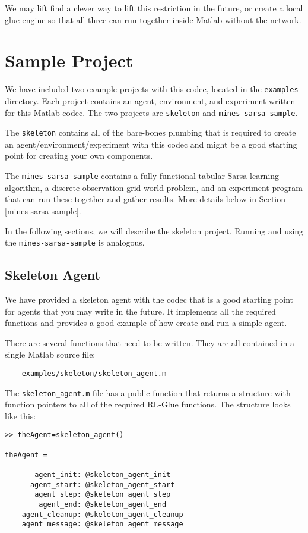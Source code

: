 \documentclass[11pt]{article}
\begin{document}
We may lift find a clever way to lift this restriction in the future, or create a local glue engine so that all three can run together inside Matlab without the network.

\section{Sample Project}
We have included two example projects with this codec, located in the \texttt{examples} directory.  Each project contains an agent, environment, and experiment written for this Matlab codec.  The two projects are \texttt{skeleton} and \texttt{mines-sarsa-sample}.

The \texttt{skeleton} contains all of the bare-bones plumbing that is required to create an agent/environment/experiment with this codec and might be a good starting point for creating your own components.

The \texttt{mines-sarsa-sample} contains a fully functional tabular Sarsa learning algorithm, a discrete-observation grid world problem, and an experiment program that can run these together and gather results.  More details below in Section \ref{mines-sarsa-sample}.

In the following sections, we will describe the skeleton project.  Running and using the \texttt{mines-sarsa-sample} is analogous.

\subsection{Skeleton Agent}
\label{sec:agent}
We have provided a skeleton agent with the codec that is a good starting point for agents that you may write in the future.
It implements all the required functions and provides a good example of how create and run a simple agent.

There are several functions that need to be written. They are all contained in a single Matlab source file:
\begin{verbatim}
	examples/skeleton/skeleton_agent.m
\end{verbatim}

The \texttt{skeleton\_agent.m} file has a public function that returns a structure with function pointers to all of the required RL-Glue functions.  The structure looks like this:

\begin{verbatim}
>> theAgent=skeleton_agent()

theAgent = 

       agent_init: @skeleton_agent_init
      agent_start: @skeleton_agent_start
       agent_step: @skeleton_agent_step
        agent_end: @skeleton_agent_end
    agent_cleanup: @skeleton_agent_cleanup
    agent_message: @skeleton_agent_message
\end{verbatim}
\end{document}
